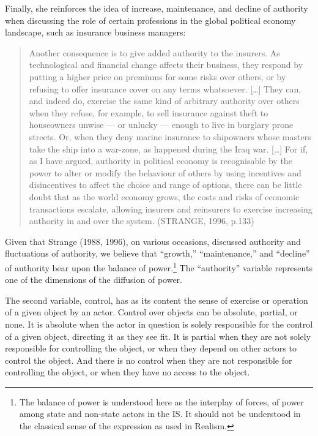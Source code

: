 Finally, she reinforces the idea of increase, maintenance, and decline of authority when discussing the role of certain professions in the global political economy landscape, such as insurance business managers:

\begin{quote}
Another consequence is to give added authority to the insurers. As technological and financial change affects their business, they respond by putting a higher price on premiums for some risks over others, or by refusing to offer insurance cover on any terms whatsoever. {[}\ldots{]} They can, and indeed do, exercise the same kind of arbitrary authority over others when they refuse, for example, to sell insurance against theft to houseowners unwise --- or unlucky --- enough to live in burglary prone streets. Or, when they deny marine insurance to shipowners whose masters take the ship into a war-zone, as happened during the Iraq war. {[}\ldots{]} For if, as I have argued, authority in political economy is recognisable by the power to alter or modify the behaviour of others by using incentives and disincentives to affect the choice and range of options, there can be little doubt that as the world economy grows, the costs and risks of economic transactions escalate, allowing insurers and reinsurers to exercise increasing authority in and over the system. (STRANGE, 1996, p.133)
\end{quote}

Given that Strange (1988, 1996), on various occasions, discussed authority and fluctuations of authority, we believe that ``growth,'' ``maintenance,'' and ``decline'' of authority bear upon the balance of power.\footnote{The balance of power is understood here as the interplay of forces, of power among state and non-state actors in the IS. It should not be understood in the classical sense of the expression as used in Realism.} The ``authority'' variable represents one of the dimensions of the diffusion of power.

The second variable, control, has as its content the sense of exercise or operation of a given object by an actor. Control over objects can be absolute, partial, or none. It is absolute when the actor in question is solely responsible for the control of a given object, directing it as they see fit. It is partial when they are not solely responsible for controlling the object, or when they depend on other actors to control the object. And there is no control when they are not responsible for controlling the object, or when they have no access to the object.

